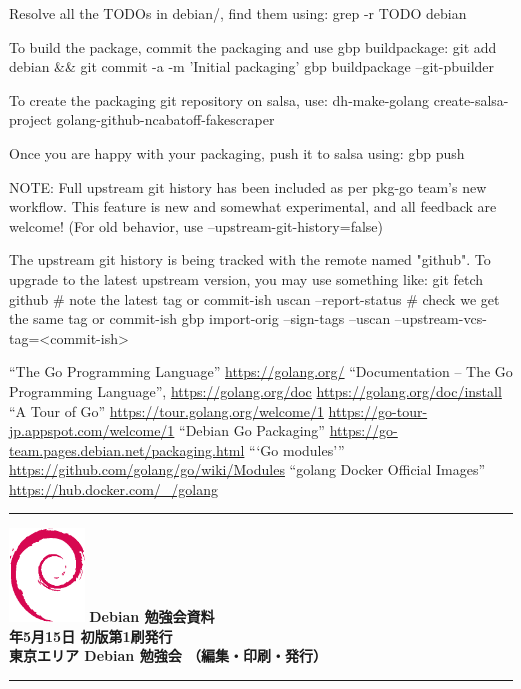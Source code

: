 \documentclass[mingoth,a4paper]{jsarticle}
\newcommand{\debmtgyear}{2021}
\newcommand{\debmtgmonth}{5}
\newcommand{\debmtgdate}{15}
\begin{document}
\begin{commandline}
Resolve all the TODOs in debian/, find them using:
    grep -r TODO debian

To build the package, commit the packaging and use gbp buildpackage:
    git add debian && git commit -a -m 'Initial packaging'
    gbp buildpackage --git-pbuilder

To create the packaging git repository on salsa, use:
    dh-make-golang create-salsa-project golang-github-ncabatoff-fakescraper

Once you are happy with your packaging, push it to salsa using:
    gbp push

NOTE: Full upstream git history has been included as per pkg-go team's
      new workflow.  This feature is new and somewhat experimental,
      and all feedback are welcome!
      (For old behavior, use --upstream-git-history=false)

The upstream git history is being tracked with the remote named "github".
To upgrade to the latest upstream version, you may use something like:
    git fetch github          # note the latest tag or commit-ish
    uscan --report-status     # check we get the same tag or commit-ish
    gbp import-orig --sign-tags --uscan --upstream-vcs-tag=<commit-ish>
 
\end{commandline}

\begin{thebibliography}{1}
  ``The Go Programming Language'' \url{https://golang.org/}
  ``Documentation -- The Go Programming Language'', \url{https://golang.org/doc}
  \url{https://golang.org/doc/install}
  ``A Tour of Go'' \url{https://tour.golang.org/welcome/1}
  \url{https://go-tour-jp.appspot.com/welcome/1}
  ``Debian Go Packaging'' \url{https://go-team.pages.debian.net/packaging.html}
  ```Go modules''' \url{https://github.com/golang/go/wiki/Modules}
  ``golang Docker Official Images'' \url{https://hub.docker.com/_/golang}
\end{thebibliography}



\mbox{}\newpage
\mbox{}\newpage

\vspace*{15cm}
\hrule
\vspace{2mm}
\includegraphics[width=2cm]{image-assets/openlogo-nd.eps}
\noindent \Large \bf Debian 勉強会資料\\
\noindent \normalfont \debmtgyear{}年\debmtgmonth{}月\debmtgdate{}日 \hspace{5mm}  初版第1刷発行\\
\noindent \normalfont 東京エリア Debian 勉強会 （編集・印刷・発行）\\
\hrule
\end{document}
